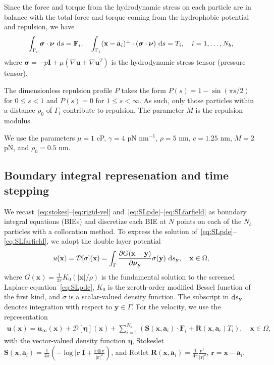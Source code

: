 \documentclass[prb,preprint,showpacs,preprintnumbers,amsmath,amssymb,longbibliography]{revtex4-1}
\renewcommand{\aa}{\mathbf{a}}
\newcommand{\DD}{\mathcal{D}}
\newcommand{\eeta}{\boldsymbol{\eta}}
\newcommand{\FF}{\mathbf{F}}
\newcommand{\nnu}{\boldsymbol{\nu}}
\newcommand{\ssigma}{\boldsymbol{\sigma}}
\newcommand{\rr}{\mathbf{r}}
\newcommand{\RR}{\mathbf{R}}
\renewcommand{\SS}{\mathbf{S}}
\newcommand{\xx}{\mathbf{x}}
\newcommand{\uu}{\mathbf{u}}
\newcommand{\yy}{\mathbf{y}}
\begin{document}
Since the force and torque from the hydrodynamic stress on each particle
are in balance with the total force and torque coming from the
hydrophobic potential and repulsion, we have
\begin{equation}
  \label{eq:force}
 \int_{\Gamma_i} \ssigma \cdot \nnu \, \dif s = \FF_i, \quad
 \int_{\Gamma_i} (\xx - \aa_i)^\perp \cdot 
  (\ssigma \cdot \nnu) \, \dif s = T_i,
  \quad i=1,\ldots,N_b,
\end{equation}
where 
$\ssigma = -p \mathbf{I} + \mu \left(\nabla \uu + \nabla \uu^T
\right)$ is the hydrodynamic stress tensor (pressure tensor).

The dimensionless repulsion profile $P$ takes the form $P(s) = 1 -
\sin(\pi s/2)$ for $0 \leq s < 1$ and $P(s) = 0$ for $1 \leq s <
\infty$.  As such, only those particles within a distance $\rho_0$ of
$\Gamma_i$ contribute to repulsion.  The parameter $M$ is the repulsion
modulus.

We use the parameters $\mu = 1$ cP, $\gamma = 4$ pN nm$^{-1}$,
$\rho = 5$ nm, $c = 1.25$ nm, $M = 2$ pN, and $\rho_0 = 0.5$ nm.

\subsection{Boundary integral represenation and time stepping}
We recast~\eqref{eq:stokes}--\eqref{eq:rigid-vel}
and~\eqref{eq:SLpde}--\eqref{eq:SLfarfield} as boundary integral
equations (BIEs) and discretize each BIE at $N$ points on each of the
$N_b$ particles with a collocation method. To express the solution
of~\eqref{eq:SLpde}--\eqref{eq:SLfarfield}, we adopt the double layer
potential
\begin{align}
\label{eq:SL_BIE}
  u({\xx}) = \DD[\sigma](\xx) = \int_\Gamma 
    \frac{\partial G(\xx-\yy)}{\partial \nnu_\yy}\sigma(\yy)\, 
    \dif s_\yy, \quad \xx \in \Omega,
\end{align}
where $G(\xx) = \frac{1}{2\pi}K_0(|\xx|/\rho)$ is the fundamental
solution to the screened Laplace equation~\eqref{eq:SLpde}, $K_0$ is the
zeroth-order modified Bessel function of the first kind, and $\sigma$ is
a scalar-valued density function.  The subscript in $\dif s_\yy$ denotes
integration with respect to $\yy \in \Gamma$.  For the velocity, we use
the representation~\cite{pow-mir1987}
\begin{align}
  \label{eq:velocity}
  \uu(\xx) = \uu_\infty(\xx) + \DD[\eeta](\xx) + 
    \sum_{i=1}^{N_b} \left(\SS(\xx,\aa_i) \cdot \FF_i + 
    \RR(\xx,\aa_i) T_i\right), \quad \xx \in \Omega,
\end{align}
with the vector-valued density function $\eeta$, Stokeslet
$\SS(\xx,\aa_i) = \frac{1}{4\pi} \left(-\log |\rr|\mathbf{I} + \frac{\rr
\otimes \rr}{|\rr|^2}\right)$, and Rotlet $\RR(\xx,\aa_i) =
\frac{1}{4\pi} \frac{\rr^\perp}{|\rr|^2}$, $\rr = \xx - \aa_i$.
    
\end{document}
